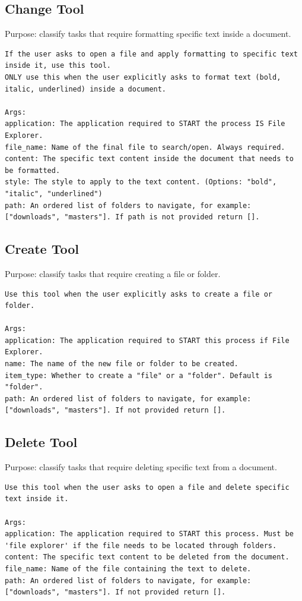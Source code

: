 \subsection{Change Tool}

Purpose: classify tasks that require formatting specific text inside a document.

\begin{lstlisting}
If the user asks to open a file and apply formatting to specific text inside it, use this tool.
ONLY use this when the user explicitly asks to format text (bold, italic, underlined) inside a document.

Args:
application: The application required to START the process IS File Explorer.
file_name: Name of the final file to search/open. Always required.
content: The specific text content inside the document that needs to be formatted.
style: The style to apply to the text content. (Options: "bold", "italic", "underlined")
path: An ordered list of folders to navigate, for example: ["downloads", "masters"]. If path is not provided return [].
\end{lstlisting}

\subsection{Create Tool}

Purpose: classify tasks that require creating a file or folder.

\begin{lstlisting}
Use this tool when the user explicitly asks to create a file or folder.

Args:
application: The application required to START this process if File Explorer.
name: The name of the new file or folder to be created.
item_type: Whether to create a "file" or a "folder". Default is "folder".
path: An ordered list of folders to navigate, for example: ["downloads", "masters"]. If not provided return [].
\end{lstlisting}

\subsection{Delete Tool}

Purpose: classify tasks that require deleting specific text from a document.

\begin{lstlisting}
Use this tool when the user asks to open a file and delete specific text inside it.

Args:
application: The application required to START this process. Must be 'file explorer' if the file needs to be located through folders.
content: The specific text content to be deleted from the document.
file_name: Name of the file containing the text to delete.
path: An ordered list of folders to navigate, for example: ["downloads", "masters"]. If not provided return [].
\end{lstlisting}

